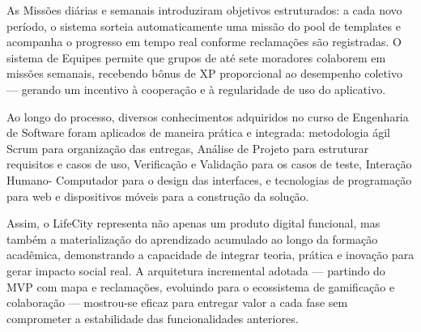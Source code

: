 As Missões diárias e semanais introduziram objetivos estruturados: a cada novo
período, o sistema sorteia automaticamente uma missão do pool de templates e
acompanha o progresso em tempo real conforme reclamações são registradas. O
sistema de Equipes permite que grupos de até sete moradores colaborem em missões
semanais, recebendo bônus de XP proporcional ao desempenho coletivo — gerando
um incentivo à cooperação e à regularidade de uso do aplicativo.

Ao longo do processo, diversos conhecimentos adquiridos no curso de Engenharia
de Software foram aplicados de maneira prática e integrada: metodologia ágil Scrum
para organização das entregas, Análise de Projeto para estruturar requisitos e casos
de uso, Verificação e Validação para os casos de teste, Interação Humano-
Computador para o design das interfaces, e tecnologias de programação para web e
dispositivos móveis para a construção da solução.

Assim, o LifeCity representa não apenas um produto digital funcional, mas também
a materialização do aprendizado acumulado ao longo da formação acadêmica,
demonstrando a capacidade de integrar teoria, prática e inovação para gerar impacto
social real. A arquitetura incremental adotada — partindo do MVP com mapa e
reclamações, evoluindo para o ecossistema de gamificação e colaboração — mostrou-se
eficaz para entregar valor a cada fase sem comprometer a estabilidade das
funcionalidades anteriores.
